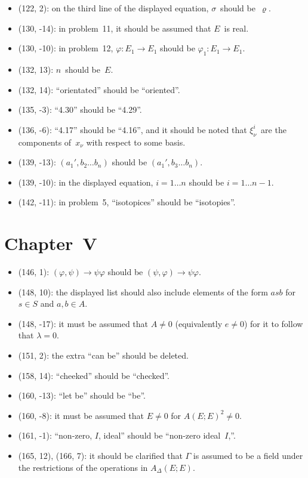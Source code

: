 \documentclass[letterpaper,12pt]{article}
\begin{document}
\begin{itemize}
\item (122, 2): on the third line of the displayed equation, \(\sigma\)~should be~\(\varrho\).
\item (130, -14): in problem~11, it should be assumed that \(E\)~is real.
\item (130, -10): in problem~12, \(\varphi:E_1\to E_1\) should be \(\varphi_1:E_1\to E_1\).
\item (132, 13): \(n\)~should be~\(E\).
\item (132, 14): ``orientated'' should be ``oriented''.
\item (135, -3): ``4.30'' should be ``4.29''.
\item (136, -6): ``4.17'' should be ``4.16'', and it should be noted that \(\xi^i_{\nu}\)~are the components of~\(x_{\nu}\) with respect to some basis.
\item (139, -13): \((a_1',b_2\ldots b_n)\) should be \((a_1',b_3\ldots b_n)\).
\item (139, -10): in the displayed equation, \(i=1\ldots n\) should be \(i=1\ldots n-1\).
\item (142, -11): in problem~5, ``isotopices'' should be ``isotopies''.
\end{itemize}

\section*{Chapter~V}
\begin{itemize}
\item (146, 1): \((\varphi,\psi)\to\psi\varphi\) should be \((\psi,\varphi)\to\psi\varphi\).
\item (148, 10): the displayed list should also include elements of the form \(asb\) for \(s\in S\) and \(a,b\in A\).
\item (148, -17): it must be assumed that \(A\ne 0\) (equivalently \(e\ne 0\)) for it to follow that \(\lambda=0\).
\item (151, 2): the extra ``can be'' should be deleted.
\item (158, 14): ``cheeked'' should be ``checked''.
\item (160, -13): ``let be'' should be ``be''.
\item (160, -8): it must be assumed that \(E\ne 0\) for \(A(E;E)^2\ne 0\).
\item (161, -1): ``non-zero, \(I\), ideal'' should be ``non-zero ideal~\(I\),''.
\item (165, 12), (166, 7): it should be clarified that \(\Gamma\) is assumed to be a field under the restrictions of the operations in \(A_{\Delta}(E;E)\).
\end{itemize}
\end{document}
